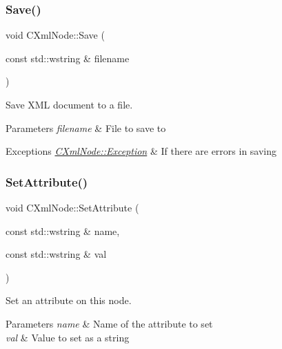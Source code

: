 \subsubsection{\texorpdfstring{Save()}{Save()}}
{\footnotesize\ttfamily void C\+Xml\+Node\+::\+Save (\begin{DoxyParamCaption}\item[{const std\+::wstring \&}]{filename }\end{DoxyParamCaption})}



Save X\+ML document to a file. 


\begin{DoxyParams}{Parameters}
{\em filename} & File to save to \\
\hline
\end{DoxyParams}

\begin{DoxyExceptions}{Exceptions}
{\em \mbox{\hyperlink{classxmlnode_1_1_c_xml_node_1_1_exception}{C\+Xml\+Node\+::\+Exception}}} & If there are errors in saving \\
\hline
\end{DoxyExceptions}
\mbox{\label{classxmlnode_1_1_c_xml_node_ac2543c8908d29642f70c9ce437475bf1}} 
\subsubsection{\texorpdfstring{Set\+Attribute()}{SetAttribute()}\hspace{0.1cm}{\footnotesize\ttfamily [1/3]}}
{\footnotesize\ttfamily void C\+Xml\+Node\+::\+Set\+Attribute (\begin{DoxyParamCaption}\item[{const std\+::wstring \&}]{name,  }\item[{const std\+::wstring \&}]{val }\end{DoxyParamCaption})}



Set an attribute on this node. 


\begin{DoxyParams}{Parameters}
{\em name} & Name of the attribute to set \\
\hline
{\em val} & Value to set as a string \\
\hline
\end{DoxyParams}
\mbox{\label{classxmlnode_1_1_c_xml_node_a6771d1de541ffefcf8a4fcd809b12b62}} 
